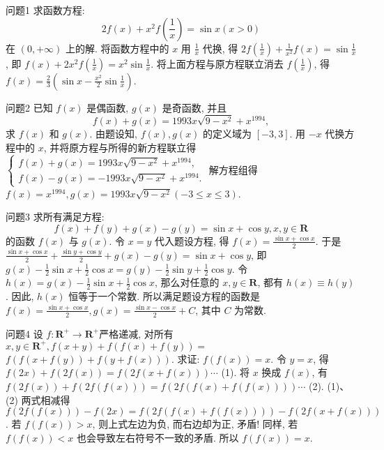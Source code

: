 
问题1 求函数方程:
$$
2 f(x)+x^2 f\left(\frac{1}{x}\right)=\sin x(x>0)
$$
在 $(0,+\infty)$ 上的解.
将函数方程中的 $x$ 用 $\frac{1}{x}$ 代换, 得 $2 f\left(\frac{1}{x}\right)+\frac{1}{x^2} f(x)=\sin \frac{1}{x}$, 即 $f(x)+ 2 x^2 f\left(\frac{1}{x}\right)=x^2 \sin \frac{1}{x}$. 将上面方程与原方程联立消去 $f\left(\frac{1}{x}\right)$, 得 $f(x)= \frac{2}{3}\left(\sin x-\frac{x^2}{2} \sin \frac{1}{x}\right)$.



问题2 已知 $f(x)$ 是偶函数, $g(x)$ 是奇函数, 并且
$$
f(x)+g(x)=1993 x \sqrt{9-x^2}+x^{1994},
$$
求 $f(x)$ 和 $g(x)$.
由题设知, $f(x), g(x)$ 的定义域为 $[-3,3]$. 用 $-x$ 代换方程中的 $x$, 并将原方程与所得的新方程联立得 $\left\{\begin{array}{l}f(x)+g(x)=1993 x \sqrt{9-x^2}+x^{1994}, \\ f(x)-g(x)=-1993 x \sqrt{9-x^2}+x^{1994} .\end{array}\right.$ 解方程组得 $f(x)=x^{1994}, g(x)=1993 x \sqrt{9-x^2}(-3 \leqslant x \leqslant 3)$.



问题3 求所有满足方程:
$$
f(x)+f(y)+g(x)-g(y)=\sin x+\cos y, x, y \in \mathbf{R}
$$
的函数 $f(x)$ 与 $g(x)$.
令 $x=y$ 代入题设方程, 得 $f(x)=\frac{\sin x+\cos x}{2}$. 于是 $\frac{\sin x+\cos x}{2}+ \frac{\sin y+\cos y}{2}+g(x)-g(y)=\sin x+\cos y$, 即 $g(x)-\frac{1}{2} \sin x+\frac{1}{2} \cos x= g(y)-\frac{1}{2} \sin y+\frac{1}{2} \cos y$. 令 $h(x)=g(x)-\frac{1}{2} \sin x+\frac{1}{2} \cos x$, 那么对任意的 $x, y \in \mathbf{R}$, 都有 $h(x) \equiv h(y)$. 因此, $h(x)$ 恒等于一个常数.
所以满足题设方程的函数是 $f(x)=\frac{\sin x+\cos x}{2}, g(x)=\frac{\sin x-\cos x}{2}+C$, 其中 $C$ 为常数.



问题4 设 $f: \mathbf{R}^{+} \rightarrow \mathbf{R}^{+}$严格递减, 对所有 $x, y \in \mathbf{R}^{+}, f(x+y)+f(f(x)+f(y))=$ $f(f(x+f(y))+f(y+f(x)))$.
求证: $f(f(x))=x$.
令 $y=x$, 得 $f(2 x)+f(2 f(x))=f(2 f(x+f(x))) \cdots$ (1). 将 $x$ 换成 $f(x)$, 有 $f(2 f(x))+f(2 f(f(x)))=f(2 f(f(x)+f(f(x)))) \cdots$ (2). (1)、 (2) 两式相减得 $f(2 f(f(x)))-f(2 x)=f(2 f(f(x)+f(f(x))))- f(2 f(x+f(x)))$. 若 $f(f(x))>x$, 则上式左边为负, 而右边却为正, 矛盾! 同样, 若 $f(f(x))<x$ 也会导致左右符号不一致的矛盾.
所以 $f(f(x))=x$.




